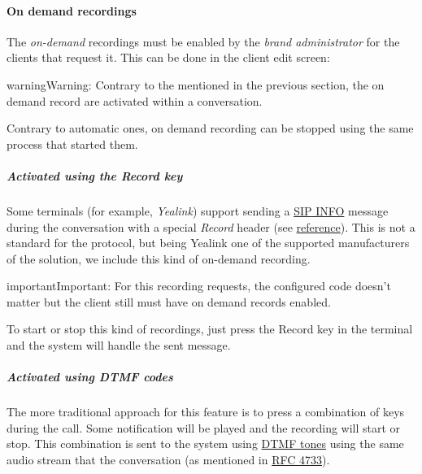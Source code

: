 \documentclass[letterpaper,10pt,english]{sphinxmanual}
\begin{document}
\paragraph{On demand recordings}
\label{administration_portal/client/vpbx/calls/call_recordings:on-demand-recordings}
The \emph{on-demand} recordings must be enabled by the \emph{brand administrator} for the
clients that request it. This can be done in the client edit screen:

\begin{notice}{warning}{Warning:}
Contrary to the {\hyperref[administration_portal/client/vpbx/services:services]{}} mentioned in the
previous section, the on demand record are activated within a conversation.
\end{notice}

Contrary to automatic ones, on demand recording can be stopped using the same
process that started them.


\subparagraph{Activated using the \emph{Record} key}
\label{administration_portal/client/vpbx/calls/call_recordings:activated-using-the-record-key}
Some terminals (for example, \emph{Yealink}) support sending a \href{https://tools.ietf.org/html/rfc6086}{SIP INFO} message during the conversation with a
special \emph{Record} header (see \href{http://www.yealink.com/Upload/document/UsingCallRecordingFeatureonYealinkPhones/UsingCallRecordingFeatureonYealinkSIPT2XPphonesRev\_610-20561729764.pdf}{reference}).
This is not a standard for the protocol, but being Yealink one of the supported
manufacturers of the solution, we include this kind of on-demand recording.

\begin{notice}{important}{Important:}
For this recording requests, the configured code doesn't matter
but the client still must have on demand records enabled.
\end{notice}

To start or stop this kind of recordings, just press the Record key in the
terminal and the system will handle the sent message.


\subparagraph{Activated using \emph{DTMF} codes}
\label{administration_portal/client/vpbx/calls/call_recordings:activated-using-dtmf-codes}
The more traditional approach for this feature is to press a combination of
keys during the call. Some notification will be played and the recording will
start or stop. This combination is sent to the system using \href{https://es.wikipedia.org/wiki/Marcaci\%C3\%B3n\_por\_tonos}{DTMF tones} using the same audio
stream that the conversation (as mentioned in \href{https://tools.ietf.org/html/rfc4733}{RFC 4733}).
\end{document}
